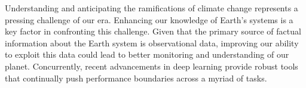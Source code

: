 \begin{bibunit}

Understanding and anticipating the ramifications of climate change represents a pressing challenge of our era. Enhancing our knowledge of Earth's systems is a key factor in confronting this challenge.
  Given that the primary source of factual information about the Earth system is observational data, improving our ability to exploit this data could lead to better monitoring and understanding of our planet.
  Concurrently, recent advancements in deep learning provide robust tools that continually push performance boundaries across a myriad of tasks. 
%
%
%

\end{bibunit}
